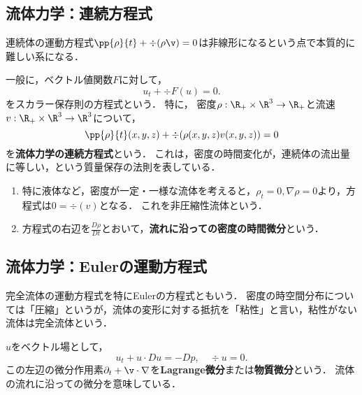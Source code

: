 \documentclass[uplatex,dvipdfmx]{jsreport}
\begin{document}
\subsection{流体力学：連続方程式}

\begin{tcolorbox}[colframe=ForestGreen, colback=ForestGreen!10!white,breakable,colbacktitle=ForestGreen!40!white,coltitle=black,fonttitle=\bfseries\sffamily,
title=]
    連続体の運動方程式$\pp{\rho}{t}+\div(\rho\v)=0$は非線形になるという点で本質的に難しい系になる．
\end{tcolorbox}

\begin{model}[質量保存の法則]
    一般に，ベクトル値関数$F$に対して，
    \[u_t+\div F(u)=0.\]
    をスカラー保存則の方程式という．
    特に，
    密度$\rho:\R_+\times\R^3\to\R_+$と流速$v:\R_+\times\R^3\to\R^3$について，
    \[\pp{\rho}{t}(x,y,z)+\div(\rho(x,y,z)v(x,y,z))=0\]
    を\textbf{流体力学の連続方程式}という．
    これは，密度の時間変化が，連続体の流出量に等しい，という質量保存の法則を表している．
    \begin{enumerate}
        \item 特に液体など，密度が一定・一様な流体を考えると，$\rho_t=0,\nabla\rho=0$より，方程式は$0=\div(v)$となる．
        これを非圧縮性流体という．
        \item 方程式の右辺を$\frac{D\rho}{Dt}$とおいて，\textbf{流れに沿っての密度の時間微分}という．
    \end{enumerate}
\end{model}

\subsection{流体力学：Eulerの運動方程式}

\begin{tcolorbox}[colframe=ForestGreen, colback=ForestGreen!10!white,breakable,colbacktitle=ForestGreen!40!white,coltitle=black,fonttitle=\bfseries\sffamily,
title=非圧縮性非粘性流体]
    完全流体の運動方程式を特にEulerの方程式ともいう．
    密度の時空間分布については「圧縮」というが，流体の変形に対する抵抗を「粘性」と言い，粘性がない流体は完全流体という．
\end{tcolorbox}

\begin{model}
    $u$をベクトル場として，
    \[u_t+u\cdot Du=-Dp,\quad\div u=0.\]
    この左辺の微分作用素$\partial_t+\v\cdot\nabla$を\textbf{Lagrange微分}または\textbf{物質微分}という．
    流体の流れに沿っての微分を意味している．
\end{model}
\end{document}
